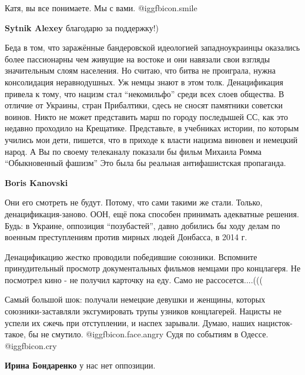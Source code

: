 \begin{itemize}

Катя, вы все понимаете. Мы с вами.  @igg{fbicon.smile} 

\textbf{Sytnik Alexey} благодарю за поддержку!)


Беда в том, что заражённые бандеровской идеологией западноукраинцы оказались
более пассионарны чем живущие на востоке и они навязали свои взгляды
значительным слоям населения. Но считаю, что битва не проиграла, нужна
консолидация неравнодушных. Уж немцы знают в этом толк. Денацификация привела к
тому, что нацизм стал \enquote{некомильфо} среди всех слоев общества. В отличие от
Украины, стран Прибалтики, сдесь не сносят памятники советски воинов. Никто не
может представить марш по городу последышей СС, как это недавно проходило на
Крещатике. Представьте, в учебниках истории, по которым учились мои дети,
пишется, что в приходе к власти нацизма виновен и немецкий народ. А Вы по
своему телеканалу показали бы фильм Михаила Ромма \enquote{Обыкновенный фашизм} Это
была бы реальная антифашистская пропаганда.

\begin{itemize} %
\textbf{Boris Kanovski} 

Они его смотреть не будут. Потому, что сами такими же стали. Только,
денацификация-заново. ООН, ещё пока способен принимать адекватные решения. Будь: в
Украине, оппозиция \enquote{позубастей}, давно добились бы ходу делам по военным
преступлениям против мирных людей Донбасса, в 2014 г.


Денацификацию жестко проводили победившие союзники. Вспомните принудительный
просмотр документальных фильмов немцами про концлагеря. Не посмотрел кино - не
получил карточку на еду. Само не рассосется....(((


Самый большой шок: получали немецкие девушки и женщины, которых
союзники-заставляли эксгумировать трупы узников концлагерей. Нацисты не успели
их сжечь при отступлении, и наспех зарывали. Думаю, наших нацисток-такое, бы не
смутило. @igg{fbicon.face.angry} Судя по событиям в Одессе. @igg{fbicon.cry} 

\textbf{Ирина Бондаренко} у нас нет оппозиции.
\end{itemize} %


\end{itemize}
